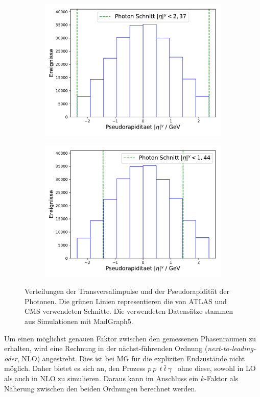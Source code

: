 \begin{figure}
\begin{subfigure}[c]{0.5\textwidth}
      \includegraphics[width=\textwidth]{Plots/photon_eta_Atlas.pdf}
    \end{subfigure}
    \begin{subfigure}[c]{0.5\textwidth}
      \includegraphics[width=\textwidth]{Plots/photon_eta_Cms.pdf}
    \end{subfigure}
    \caption{Verteilungen der Transversalimpulse und der Pseudorapidität der Photonen. Die grünen Linien representieren die von ATLAS und CMS verwendeten Schnitte. Die verwendeten Datensätze stammen aus Simulationen mit MadGraph5.}
    \label{fig:schnitte}
\end{figure}
Um einen möglichst genauen Faktor zwischen den gemessenen Phasenräumen zu erhalten, wird eine Rechnung in der nächst-führenden Ordnung (\textit{next-to-leading-oder}, NLO) angestrebt. Dies ist bei MG für die expliziten Endzustände nicht möglich. Daher bietet es sich an, den Prozess $p~p~$\textrightarrow$~t~\bar{t}~\gamma$~ ohne diese, sowohl in LO als auch in NLO zu simulieren. Daraus kann im Anschluss ein $k$-Faktor als Näherung zwischen den beiden Ordnungen berechnet werden.\\
